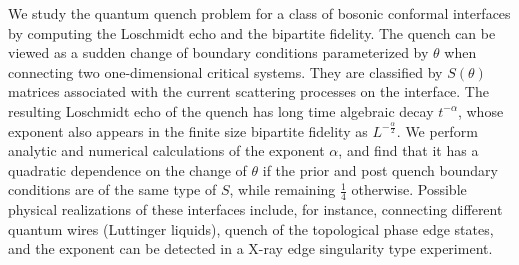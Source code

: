 
We study the quantum quench problem for a class of bosonic conformal interfaces by computing the Loschmidt echo and the bipartite fidelity. The quench can be viewed as a sudden change of boundary conditions parameterized by $\theta$ when connecting two one-dimensional critical systems. They are classified by $S(\theta)$ matrices associated with the current scattering processes on the interface. The resulting Loschmidt echo of the quench has long time algebraic decay $t^{-\alpha}$, whose exponent also appears in the finite size bipartite fidelity as $L^{-\frac{\alpha}{2}}$. We perform analytic and numerical calculations of the exponent $\alpha$, and find that it has a quadratic dependence on the change of $\theta$ if the prior and post quench boundary conditions are of the same type of $S$, while remaining $\frac{1}{4}$ otherwise. Possible physical realizations of these interfaces include, for instance, connecting different quantum wires (Luttinger liquids), quench of the topological phase edge states, \etc and the exponent can be detected in a X-ray edge singularity type experiment. 


